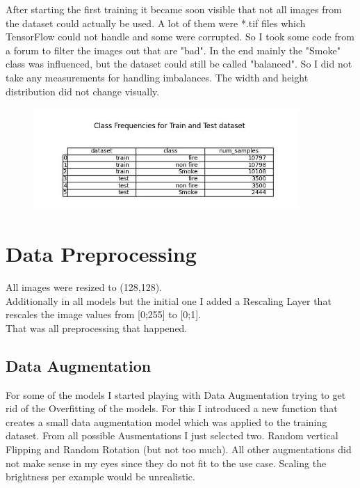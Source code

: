 \documentclass[]{article}
\begin{document}
After starting the first training it became soon visible that not all images from the dataset could actually be used. A lot of them were *.tif files which TensorFlow could not handle and some were corrupted. So I took some code from a forum to filter the images out that are "bad". In the end mainly the "Smoke" class was influenced, but the dataset could still be called "balanced". So I did not take any measurements for handling imbalances. The width and height distribution did not change visually.\\
\begin{figure}[H]
	\centering
	\includegraphics[width=0.9\textwidth]{"../visualizations/data_insights/class_frequencies.jpg"}
	\label{fig: class frequencies in test and train dataset}
\end{figure}

\section{Data Preprocessing}
All images were resized to (128,128).\\
Additionally in all models but the initial one I added a Rescaling Layer that rescales the image values from [0;255] to [0;1].\\
That was all preprocessing that happened.\\
\subsection{Data Augmentation}
For some of the models I started playing with Data Augmentation trying to get rid of the Overfitting of the models. For this I introduced a new function that creates a small data augmentation model which was applied to the training dataset. From all possible Ausmentations I just selected two. Random vertical Flipping and Random Rotation (but not too much). All other augmentations did not make sense in my eyes since they do not fit to the use case. Scaling the brightness per example would be unrealistic.\\
\end{document}
